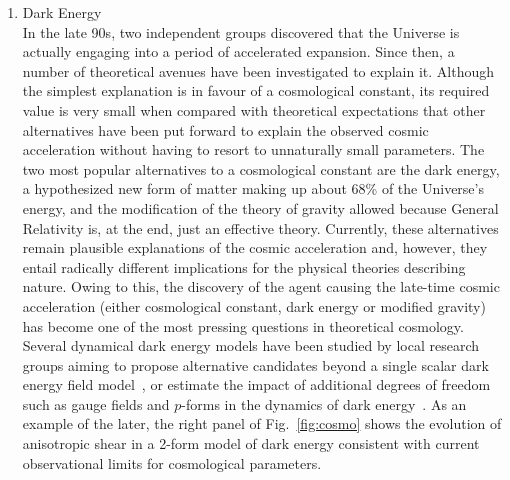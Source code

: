 \documentclass[a4paper,11pt]{article}
\begin{document}
\begin{enumerate}
%
%
\item
Dark Energy\\
In the late 90s, two independent groups discovered that the Universe is actually engaging into a period of accelerated expansion. Since then, a number of theoretical avenues have been investigated to explain it. Although the simplest explanation is in favour of a cosmological constant, its required value is very small when compared with theoretical expectations that other alternatives have been put forward to explain the observed cosmic acceleration without having to resort to unnaturally small parameters. The two most popular alternatives to a cosmological constant are the dark energy, a hypothesized new form of matter making up about 68\% of the Universe's energy, and the modification of the theory of gravity allowed because General Relativity is, at the end, just an effective theory.
Currently, these alternatives remain plausible explanations of the cosmic acceleration and, however, they entail radically different implications for the physical theories describing nature. Owing to this, the discovery of the agent causing the late-time cosmic acceleration (either cosmological constant, dark energy or modified gravity) has become one of the most pressing questions in theoretical cosmology. Several dynamical dark energy models have been studied by local research groups aiming to propose alternative candidates beyond a single scalar dark energy field model~\cite{Rodriguez:2017wkg, Alvarez:2019ues, Almeida:2020lsn, Gomez:2020sfz, Orjuela-Quintana:2020klr, Guarnizo:2020pkj}, or estimate the impact of additional degrees of freedom such as gauge fields and $p$-forms in the dynamics of dark energy~\cite{Almeida:2018fwe, Almeida:2019iqp}. As an example of the later, the right panel of Fig.~\ref{fig:cosmo}  shows the evolution of anisotropic shear in a 2-form model of dark energy consistent with current observational limits for cosmological parameters.   

\end{enumerate}
\end{document}
